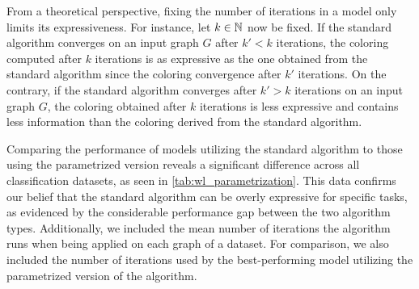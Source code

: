 From a theoretical perspective, fixing the number of \wl iterations in a \wlnn model only limits its expressiveness. For instance, let $k \in \mathbb{N}$ now be fixed. If the standard \wl algorithm converges on an input graph $G$ after $k' < k$ iterations, the coloring computed after $k$ iterations is as expressive as the one obtained from the standard \wl algorithm since the coloring convergence after $k'$ iterations. On the contrary, if the standard \wl algorithm converges after $k' > k$ iterations on an input graph $G$, the coloring obtained after $k$ iterations is less expressive and contains less information than the coloring derived from the standard \wl algorithm.

Comparing the performance of \wlnn models utilizing the standard \wl algorithm to those using the parametrized version reveals a significant difference across all classification datasets, as seen in \cref{tab:wl_parametrization}. This data confirms our belief that the standard \wl algorithm can be overly expressive for specific tasks, as evidenced by the considerable performance gap between the two algorithm types. Additionally, we included the mean number of iterations the \wl algorithm runs when being applied on each graph of a dataset. For comparison, we also included the number of \wl iterations used by the best-performing model utilizing the parametrized version of the \wl algorithm.

